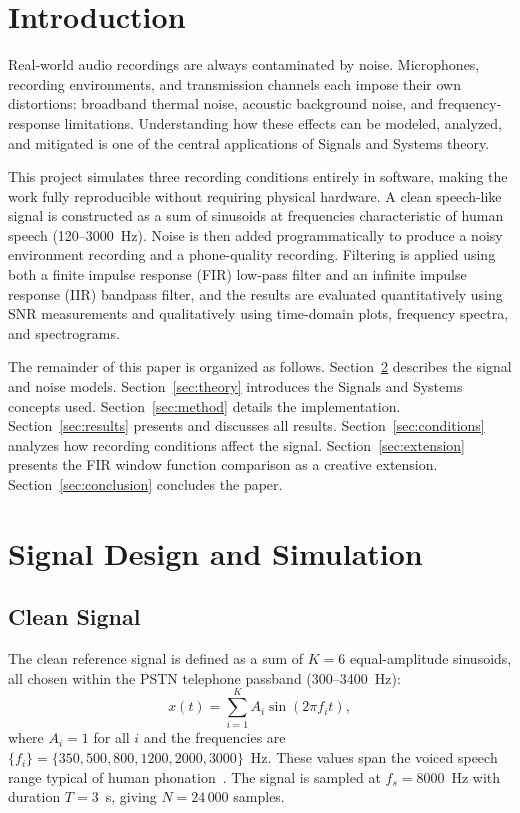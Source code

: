 \documentclass[journal]{IEEEtran}
\begin{document}
\section{Introduction}

Real-world audio recordings are always contaminated by noise. Microphones,
recording environments, and transmission channels each impose their own
distortions: broadband thermal noise, acoustic background noise, and
frequency-response limitations. Understanding how these effects can be modeled,
analyzed, and mitigated is one of the central applications of Signals and Systems
theory.

This project simulates three recording conditions entirely in software, making
the work fully reproducible without requiring physical hardware. A clean
speech-like signal is constructed as a sum of sinusoids at frequencies
characteristic of human speech (120--3000~Hz). Noise is then added
programmatically to produce a noisy environment recording and a phone-quality
recording. Filtering is applied using both a finite impulse response (FIR)
low-pass filter and an infinite impulse response (IIR) bandpass filter, and the
results are evaluated quantitatively using SNR measurements and qualitatively
using time-domain plots, frequency spectra, and spectrograms.

The remainder of this paper is organized as follows. Section~\ref{sec:signal}
describes the signal and noise models. Section~\ref{sec:theory} introduces the
Signals and Systems concepts used. Section~\ref{sec:method} details the
implementation. Section~\ref{sec:results} presents and discusses all results.
Section~\ref{sec:conditions} analyzes how recording conditions affect the signal.
Section~\ref{sec:extension} presents the FIR window function comparison as a
creative extension. Section~\ref{sec:conclusion} concludes the paper.

\section{Signal Design and Simulation}
\label{sec:signal}

\subsection{Clean Signal}

The clean reference signal is defined as a sum of $K = 6$ equal-amplitude
sinusoids, all chosen within the PSTN telephone passband (300--3400~Hz):
\begin{equation}
  x(t) = \sum_{i=1}^{K} A_i \sin(2\pi f_i t),
  \label{eq:clean}
\end{equation}
where $A_i = 1$ for all $i$ and the frequencies are
$\{f_i\} = \{350, 500, 800, 1200, 2000, 3000\}$~Hz.
These values span the voiced speech range typical of human phonation~\cite{oppenheim2010}.
The signal is sampled at $f_s = 8000$~Hz with duration $T = 3$~s, giving
$N = 24\,000$ samples.
\end{document}
